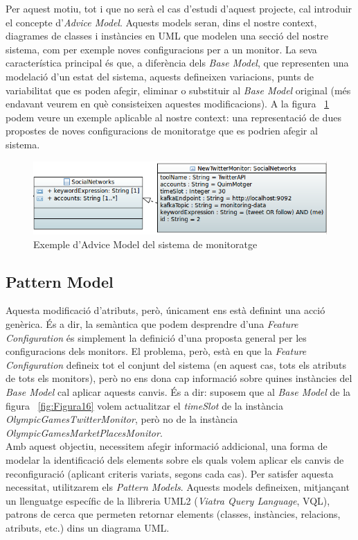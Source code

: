 Per aquest motiu, tot i que no serà el cas d'estudi d'aquest projecte, cal introduir el concepte d'\textit{Advice Model}. Aquests models seran, dins el nostre context, diagrames de classes i instàncies en UML que modelen una secció del nostre sistema, com per exemple noves configuracions per a un monitor. La seva característica principal és que, a diferència dels \textit{Base Model}, que representen una modelació d'un estat del sistema, aquests defineixen variacions, punts de variabilitat que es poden afegir, eliminar o substituir al \textit{Base Model} original (més endavant veurem en què consisteixen aquestes modificacions). A la figura ~\ref{fig:advice} podem veure un exemple aplicable al nostre context: una representació de dues propostes de noves configuracions de monitoratge que es podrien afegir al sistema.

\begin{figure}
\centering
\includegraphics[width=13cm]{Figures/advice}
\decoRule
\caption{Exemple d'Advice Model del sistema de monitoratge}
\label{fig:advice}
\end{figure}

\subsection{Pattern Model}

Aquesta modificació d'atributs, però, únicament ens està definint una acció genèrica. És a dir, la semàntica que podem desprendre d'una \textit{Feature Configuration} és simplement la definició d'una proposta general per les configuracions dels monitors. El problema, però, està en que la \textit{Feature Configuration} defineix tot el conjunt del sistema (en aquest cas, tots els atributs de tots els monitors), però no ens dona cap informació sobre quines instàncies del \textit{Base Model} cal aplicar aquests canvis. És a dir: suposem que al \textit{Base Model} de la figura ~\ref{fig:Figura16} volem actualitzar el \textit{timeSlot} de la instància \textit{OlympicGamesTwitterMonitor}, però no de la instància \textit{OlympicGamesMarketPlacesMonitor}.\\

Amb aquest objectiu, necessitem afegir informació addicional, una forma de modelar la identificació dels elements sobre els quals volem aplicar els canvis de reconfiguració (aplicant criteris variats, segons cada cas). Per satisfer aquesta necessitat, utilitzarem els \textit{Pattern Models}. Aquests models defineixen, mitjançant un llenguatge específic de la llibreria UML2 (\textit{Viatra Query Language}, VQL), patrons de cerca que permeten retornar elements (classes, instàncies, relacions, atributs, etc.) dins un diagrama UML\cite{vql}.\\ 

